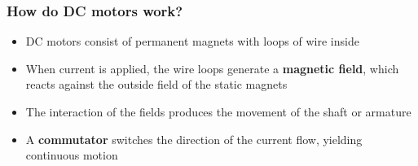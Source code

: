\documentclass[10pt]{article}
\begin{document}
\subsubsection*{How do DC motors work?}
\begin{itemize}
	\item DC motors consist of permanent magnets with loops of wire inside
	\item When current is applied, the wire loops generate a \textbf{magnetic field}, which reacts against the outside field of the static magnets
	\item The interaction of the fields produces the movement of the shaft or armature
	\item A \textbf{commutator} switches the direction of the current flow, yielding continuous motion
\end{itemize}
\end{document}
